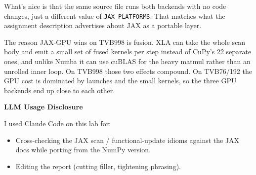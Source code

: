 \documentclass[11pt,a4paper]{article}
\begin{document}
What's nice is that the same source file runs both backends with no
code changes, just a different value of \texttt{JAX\_PLATFORMS}.
That matches what the assignment description advertises about JAX
as a portable layer.

The reason JAX-GPU wins on TVB998 is fusion. XLA can take the whole
scan body and emit a small set of fused kernels per step instead of
CuPy's 22 separate ones, and unlike Numba it can use cuBLAS for the
heavy matmul rather than an unrolled inner loop. On TVB998 those two
effects compound. On TVB76/192 the GPU cost is dominated by launches
and the small kernels, so the three GPU backends end up close to
each other.

\vspace{1em}

{\color{headingcolor}\sffamily\large\bfseries LLM Usage Disclosure}

\vspace{0.3em}

I used Claude Code on this lab for:
\begin{itemize}
    \item Cross-checking the JAX scan / functional-update idioms
    against the JAX docs while porting from the NumPy version.
    \item Editing the report (cutting filler, tightening phrasing).
\end{itemize}
\end{document}

